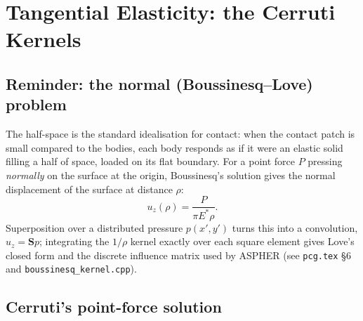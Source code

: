 \documentclass[11pt,a4paper]{article}
\newcommand{\bS}{\mathbf{S}}
\newcommand{\Estar}{E^{*}}
\newcommand{\code}[1]{\texttt{#1}}
\begin{document}
\section{Tangential Elasticity: the Cerruti Kernels}
\label{sec:cerruti}

\subsection{Reminder: the normal (Boussinesq--Love) problem}

The half-space is the standard idealisation for contact: when the contact
patch is small compared to the bodies, each body responds as if it were an
elastic solid filling a half of space, loaded on its flat boundary. For a
point force $P$ pressing \emph{normally} on the surface at the origin,
Boussinesq's solution gives the normal displacement of the surface at
distance $\rho$:
\begin{equation}
  u_z(\rho) = \frac{P}{\pi \Estar \rho}.
\end{equation}
Superposition over a distributed pressure $p(x',y')$ turns this into a
convolution, $u_z = \bS p$; integrating the $1/\rho$ kernel exactly over
each square element gives Love's closed form and the discrete influence
matrix used by ASPHER (see \code{pcg.tex} \S6 and
\code{boussinesq\_kernel.cpp}).

\subsection{Cerruti's point-force solution}
\end{document}
